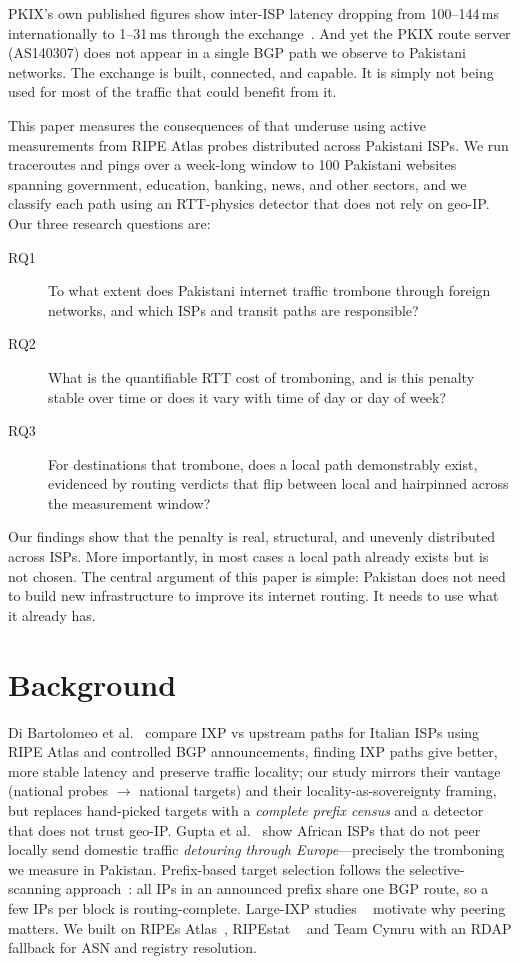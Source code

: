 \documentclass[sigconf,anonymous,10pt]{acmart}
\begin{document}
PKIX's own published figures show inter-ISP latency dropping from 100--144\,ms internationally to 1--31\,ms through the exchange~\cite{pta2026}. And yet the PKIX route server (AS140307) does not appear in a single BGP path we observe to Pakistani networks. The exchange is built, connected, and capable. It is simply not being used for most of the traffic that could benefit from it.

This paper measures the consequences of that underuse using active measurements from RIPE Atlas probes distributed across Pakistani ISPs. We run traceroutes and pings over a week-long window to 100 Pakistani websites spanning government, education, banking, news, and other sectors, and we classify each path using an RTT-physics detector that does not rely on geo-IP. Our three research questions are:

\begin{description}
  \item[RQ1] To what extent does Pakistani internet traffic trombone through foreign networks, and which ISPs and transit paths are responsible?
  \item[RQ2] What is the quantifiable RTT cost of tromboning, and is this penalty stable over time or does it vary with time of day or day of week?
  \item[RQ3] For destinations that trombone, does a local path demonstrably exist, evidenced by routing verdicts that flip between local and hairpinned across the measurement window?
\end{description}

Our findings show that the penalty is real, structural, and unevenly distributed across ISPs. More importantly, in most cases a local path already exists but is not chosen. The central argument of this paper is simple: Pakistan does not need to build new infrastructure to improve its internet routing. It needs to use what it already has.


\section{Background}
Di Bartolomeo et al.~\cite{dibartolomeo2015} compare IXP vs upstream paths for Italian ISPs
using RIPE Atlas and controlled BGP announcements, finding IXP paths give better, more stable
latency and preserve traffic locality; our study mirrors their vantage (national probes $\to$
national targets) and their locality-as-sovereignty framing, but replaces hand-picked targets
with a \emph{complete prefix census} and a detector that does not trust geo-IP. Gupta et
al.~\cite{gupta2014} show African ISPs that do not peer locally send domestic traffic
\emph{detouring through Europe}---precisely the tromboning we measure in Pakistan.
Prefix-based target selection follows the selective-scanning approach~\cite{klick2016}: all IPs
in an announced prefix share one BGP route, so a few IPs per block is routing-complete.
Large-IXP studies ~\cite{ager2012,chatzis2013} motivate why peering matters. We built on RIPEs Atlas~\cite{ripeatlas}, RIPEstat ~\cite{ripestat} and Team Cymru with an RDAP fallback for ASN
and registry resolution.
\end{document}
